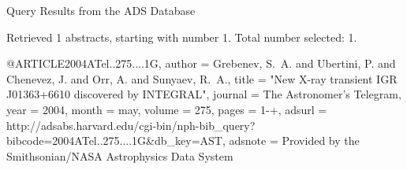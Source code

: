 Query Results from the ADS Database


Retrieved 1 abstracts, starting with number 1.  Total number selected: 1.

@ARTICLE{2004ATel..275....1G,
   author = {{Grebenev}, S.~A. and {Ubertini}, P. and {Chenevez}, J. and 
	{Orr}, A. and {Sunyaev}, R.~A.},
    title = "{New X-ray transient IGR J01363+6610 discovered by INTEGRAL}",
  journal = {The Astronomer's Telegram},
     year = 2004,
    month = may,
   volume = 275,
    pages = {1-+},
   adsurl = {http://adsabs.harvard.edu/cgi-bin/nph-bib_query?bibcode=2004ATel..275....1G&db_key=AST},
  adsnote = {Provided by the Smithsonian/NASA Astrophysics Data System}
}


